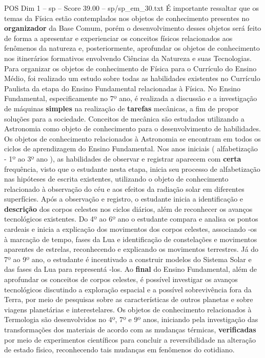 \begin{textsample}{POS Dim 1 – sp – Score 39.00 – sp/sp\_em\_30.txt}
É importante ressaltar que os temas da Física estão contemplados nos objetos de conhecimento presentes no \textbf{organizador} da Base Comum, porém o desenvolvimento desses objetos será feito de forma a apresentar e experienciar os conceitos físicos relacionados aos fenômenos da natureza e, posteriormente, aprofundar os objetos de conhecimento nos itinerários formativos envolvendo Ciências da Natureza e suas Tecnologias.
Para organizar os objetos de conhecimento de Física para o Currículo do Ensino Médio, foi realizado um estudo sobre todas as habilidades existentes no Currículo Paulista da etapa do Ensino Fundamental relacionadas à Física.
No Ensino Fundamental, especificamente no 7º ano, é realizada a discussão e a investigação de máquinas \textbf{simples} na realização de \textbf{tarefas} mecânicas, a fim de propor soluções para a sociedade.
Conceitos de mecânica são estudados utilizando a Astronomia como objeto de conhecimento para o desenvolvimento de habilidades.
Os objetos de conhecimento relacionados à Astronomia se encontram em todos os ciclos de aprendizagem do Ensino Fundamental.
Nos anos iniciais ( alfabetização - 1º ao 3º ano ), as habilidades de observar e registrar aparecem com \textbf{certa} frequência, visto que o estudante nesta etapa, inicia seu processo de alfabetização nas hipóteses de escrita existentes, utilizando o objeto de conhecimento relacionado à observação do céu e aos efeitos da radiação solar em diferentes superfícies.
Após a observação e registro, o estudante inicia a identificação e \textbf{descrição} dos corpos celestes nos ciclos diários, além de reconhecer os avanços tecnológicos existentes.
Do 4º ao 6º ano o estudante compara e analisa os pontos cardeais e inicia a explicação dos movimentos dos corpos celestes, associando -os à marcação de tempo, fases da Lua e identificação de constelações e movimentos aparentes de estrelas, reconhecendo e explicando os movimentos terrestres.
Já do 7º ao 9º ano, o estudante é incentivado a construir modelos do Sistema Solar e das fases da Lua para representá -los.
Ao \textbf{final} do Ensino Fundamental, além de aprofundar os conceitos de corpos celestes, é possível investigar os avanços tecnológicos discutindo a exploração espacial e a possível sobrevivência fora da Terra, por meio de pesquisas sobre as características de outros planetas e sobre viagens planetárias e interestelares.
Os objetos de conhecimento relacionados à Termologia são desenvolvidos no 4º, 7º e 9º anos, iniciando pela investigação das transformações dos materiais de acordo com as mudanças térmicas, \textbf{verificadas} por meio de experimentos científicos para concluir a reversibilidade na alteração de estado físico, reconhecendo tais mudanças em fenômenos do cotidiano.

\end{textsample}
